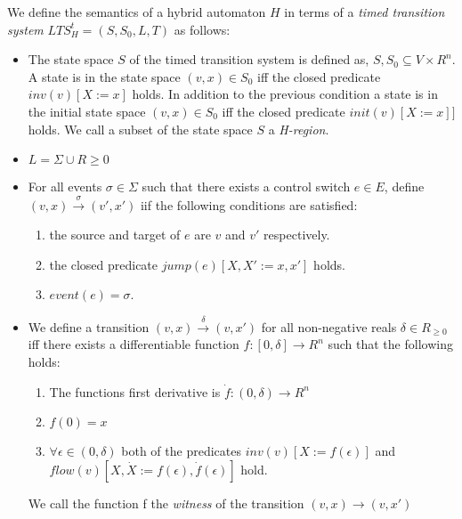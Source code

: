 \medskip
\begin{mydef}
We define the semantics of a hybrid automaton $H$ in terms of a \emph{timed transition system} $LTS^t_H = (S,S_0,L,T)$ as follows:


\begin{itemize}
 
\item The state space $S$ of the timed transition system is defined as, $S, S_0 \subseteq V \times R^n$. A state is in the state space $(v,x) \in S_0$ iff the closed predicate $inv(v)[X := x]$ holds. In addition to the previous condition a state is in the initial state space $(v,x) \in S_0$ iff the closed predicate $init(v)[X := x]]$ holds. We call a subset of the state space $S$ a \emph{H-region}.


\item $L = \Sigma \cup R {\geq 0}$

\item For all events $\sigma \in \Sigma$ such that there exists a control switch $e \in E$, define $(v,x) \xrightarrow{\sigma} (v',x')$ iif the following conditions are satisfied:
\begin{enumerate}
\item the source and target of $e$ are $v$ and $v'$ respectively. 
\item the closed predicate $jump(e)[X, X' := x,x']$ holds.
\item $event(e) = \sigma$.
\end{enumerate}

\item We define a transition $(v,x) \xrightarrow{\delta} (v,x')$ for all non-negative reals $\delta \in R_{\geq 0}$ iff there exists a differentiable function $f: [0, \delta] \to R^n$ such that the following holds:
\begin{enumerate}
\item The functions first derivative is $\dot{f} :(0,\delta) \to R^n$
\item $f(0) = x$
\item $\forall \epsilon \in (0,\delta)$ both of the predicates $inv(v)[X := f(\epsilon)]$ and $flow(v)[X,\dot{X} := f(\epsilon),\dot{f}(\epsilon)]$ hold.
\end{enumerate}
We call the function f the \emph{witness} of the transition $(v,x) \to (v, x')$

\end{itemize}


\end{mydef}
